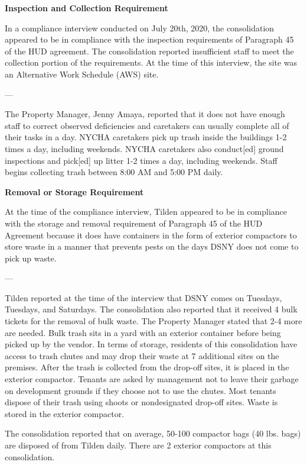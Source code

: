 

\textbf{Inspection and Collection Requirement}

In a compliance interview conducted on July 20th, 2020, the consolidation appeared to be in compliance with the inspection requirements of Paragraph 45 of the HUD agreement. The consolidation reported insufficient staff to meet the collection portion of the requirements. At the time of this interview, the site was an Alternative Work Schedule (AWS) site. 

---

The Property Manager, Jenny Amaya, reported that it does not have enough staff to correct observed deficiencies and caretakers can usually complete all of their tasks in a day. NYCHA caretakers pick up trash inside the buildings 1-2 times a day, including weekends. NYCHA caretakers also conduct[ed] ground inspections and pick[ed] up litter 1-2 times a day, including weekends. Staff begins collecting trash between 8:00 AM and 5:00 PM daily. 

\textbf{Removal or Storage Requirement}

At the time of the compliance interview, Tilden appeared to be in compliance with the storage and removal requirement of Paragraph 45 of the HUD Agreement because it does have containers in the form of exterior compactors to store waste in a manner that prevents pests on the days DSNY does not come to pick up waste.

---

Tilden reported at the time of the interview that DSNY comes on Tuesdays, Tuesdays, and Saturdays. The consolidation also reported that it received 4 bulk tickets for the removal of bulk waste. The Property Manager stated that 2-4 more are needed. Bulk trash sits in a yard with an exterior container before being picked up by the vendor. In terms of storage, residents of this consolidation have access to trash chutes and may drop their waste at 7 additional sites on the premises. After the trash is collected from the drop-off sites, it is placed in the exterior compactor. Tenants are asked by management not to leave their garbage on development grounds if they choose not to use the chutes. Most tenants dispose of their trash using shoots or nondesignated drop-off sites. Waste is stored in the exterior compactor. 

The consolidation reported that on average, 50-100 compactor bags (40 lbs. bags) are disposed of from Tilden daily. There are 2 exterior compactors at this consolidation.
